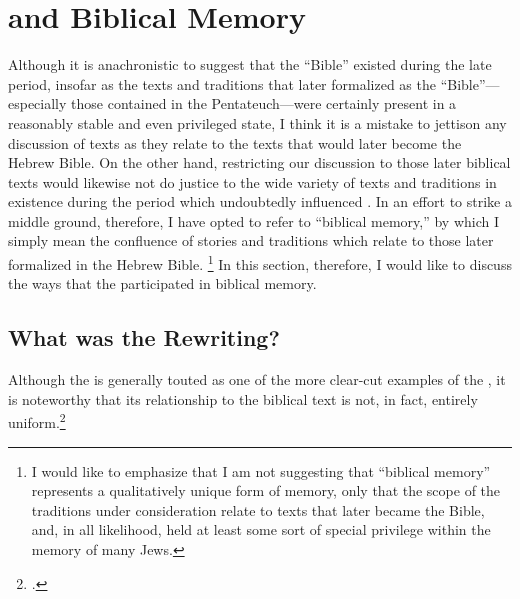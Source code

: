 
\section{\ga and Biblical Memory}


Although it is anachronistic to suggest that the ``Bible''  existed during the late \secondtemple period, insofar as the texts and traditions that later formalized as the ``Bible''---especially those contained in the Pentateuch---were certainly present in a reasonably stable and even privileged state, I think it is a mistake to jettison any discussion of \rwb texts as they relate to the texts that would later become the Hebrew Bible. On the other hand, restricting our discussion to those later biblical texts would likewise not do justice to the wide variety of texts and traditions in existence during the \secondtemple period which undoubtedly influenced \ga. In an effort to strike a middle ground, therefore, I have opted to refer to ``biblical memory,'' by which I simply mean the confluence of stories and traditions which relate to those later formalized in the Hebrew Bible.%
%
\footnote{I would like to emphasize that I am not suggesting that ``biblical memory'' represents a qualitatively unique form of memory, only that the scope of the traditions under consideration relate to texts that later became the Bible, and, in all likelihood, held at least some sort of special privilege within the memory of many \secondtemple Jews.}
%
In this section, therefore, I would like to discuss the ways that the \ga participated in biblical memory.

\subsection{What was the \ga Rewriting?}

Although the \ga is generally touted as one of the more clear-cut examples of the \rwb, it is noteworthy that its relationship to the biblical text is not, in fact, entirely uniform.\footnote{\cite[333]{bernstein_berthelot-etal2010}.}

